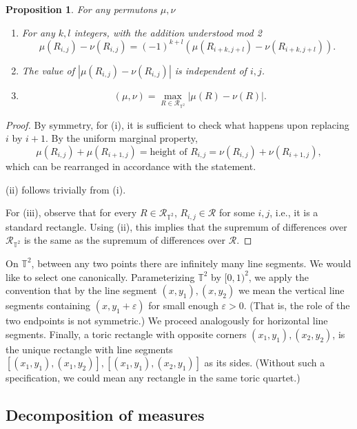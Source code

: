 \documentclass{article}
\newcommand{\ds}{\mathop{d_\square}}
\newtheorem{prop}[theorem]{Proposition}
\theoremstyle{definition}
\begin{document}
\begin{prop} \label{prop:torus_unit_square_identification}
    For any permutons $\mu, \nu$
    \begin{enumerate}[label=(\roman*)]
        \item{For any $k, l$ integers, with the addition understood mod 2
        $$\mu(R_{i, j})-\nu(R_{i, j})=(-1)^{k+l}\left(\mu(R_{i+k, j+l})-\nu(R_{i+k, j+l})\right).$$}\label{item1:prop:torus_unit_square_identification}
        \item The value of $|\mu(R_{i, j})-\nu(R_{i, j})|$ is independent of $i, j$.
        \item $$\ds(\mu, \nu)=\max_{R\in\mathcal{R}_{\mathbb{T}^2}}|\mu(R)-\nu(R)|.$$
    \end{enumerate}
\end{prop}

\begin{proof}
    By symmetry, for (i), it is sufficient to check what happens upon replacing $i$ by $i+1$. By the uniform marginal property,
    $$\mu(R_{i, j})+\mu(R_{i+1, j})=\text{height of $R_{i, j}$}=\nu(R_{i, j})+\nu(R_{i+1, j}),$$
    which can be rearranged in accordance with the statement.

    (ii) follows trivially from (i).

    For (iii), observe that for every $R\in \mathcal{R}_{\mathbb{T}^2}$, $R_{i, j}\in \mathcal{R}$ for some $i, j$, i.e., it is a standard rectangle. Using (ii), this implies that the supremum of differences over $\mathcal{R}_{\mathbb{T}^2}$ is the same as the supremum of differences over $\mathcal{R}$.
\end{proof}

On $\mathbb{T}^2$, between any two points there are infinitely many line segments. We would like to select one canonically. Parameterizing $\mathbb{T}^2$ by $[0, 1)^2$, we apply the convention that by the line segment $(x, y_1), (x, y_2)$ we mean the vertical line segments containing $(x, y_1+\varepsilon)$ for small enough $\varepsilon>0$. (That is, the role of the two endpoints is not symmetric.) We proceed analogously for horizontal line segments. Finally, a toric rectangle with opposite corners $(x_1, y_1), (x_2, y_2)$, is the unique rectangle with line segments  $[(x_1, y_1), (x_1, y_2)], [(x_1, y_1), (x_2, y_1)]$ as its sides. (Without such a specification, we could mean any rectangle in the same toric quartet.)

\subsection{Decomposition of measures}
\end{document}
